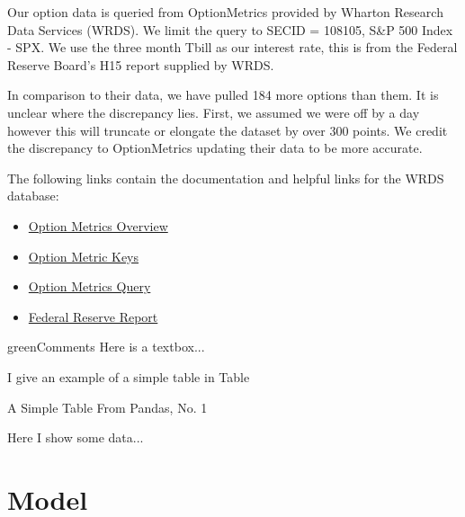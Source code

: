 Our option data is queried from OptionMetrics provided by Wharton Research Data Services (WRDS). We limit the query to SECID = 108105, S\&P 500 Index - SPX. We use the three month Tbill as our interest rate, this is from the Federal Reserve Board's H15 report supplied by WRDS. 

In comparison to their data, we have pulled 184 more options than them. It is unclear where the discrepancy lies. First, we assumed we were off by a day however this will truncate or elongate the dataset by over 300 points. We credit the discrepancy to OptionMetrics updating their data to be more accurate. 

The following links contain the documentation and helpful links for the WRDS database: 
\begin{itemize}
\item \href{https://wrds-www.wharton.upenn.edu/pages/support/manuals-and-overviews/optionmetrics/wrds-overview-optionmetrics/}{Option Metrics Overview} 
\item \href{https://wrds-www.wharton.upenn.edu/data-dictionary/optionm_all/opprcd2023/ }{Option Metric Keys}
\item \href{https://wrds-www.wharton.upenn.edu/pages/get-data/optionmetrics/ivy-db-us/options/option-prices/}{Option Metrics Query} 
\item \href{https://wrds-www.wharton.upenn.edu/data-dictionary/frb_all/rates_daily/}{Federal Reserve Report} 
\end{itemize}

\begin{textbox}{green}{Comments}
Here is a textbox...
\end{textbox}

I give an example of a simple table in Table 


\begin{table}
\caption{A Simple Table From Pandas, No. 1}
\centering

\caption*{
  Here I show some data...
}
\label{table:pandas_to_latex_simple_table1.tex}
\end{table}


\section{Model}

